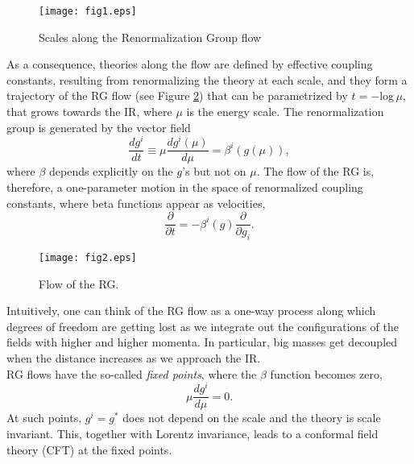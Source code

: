 \documentclass[12pt,a4paper]{article}
\numberwithin{equation}{section}
\begin{document}
\begin{figure}[b]
\begin{center}
\texttt{[image: fig1.eps]}
\caption{\small Scales along the Renormalization Group flow}
\label{figureRGFlow}
\end{center}
\end{figure}


As a consequence, theories along the flow are defined by effective coupling constants, resulting from renormalizing the theory at each scale, and they form a trajectory of the RG flow (see Figure \ref{figureRG_g_Flow}) that can be parametrized by %
$t=-$log$\,\mu$, that grows towards the IR, where $\mu$ is the energy scale. The renormalization group is generated by the vector field
  \begin{equation}
    \frac{d g^i}{dt}\equiv\mu\frac{d g^i(\mu)}{d\mu}=\beta^i(g(\mu)),\nonumber
  \end{equation}
where $\beta$ depends explicitly on the $g$'s but not on $\mu$.
The flow of the RG is, therefore, a one-parameter motion \cite{wilson} in the space of renormalized coupling constants, where beta functions appear as velocities,
%
%
  \begin{equation}
    \frac{\partial}{\partial t} = -\beta^i(g)\frac{\partial}{\partial g_i}.\nonumber
  \end{equation}
\begin{figure}[h]
\begin{center}
\texttt{[image: fig2.eps]}
\caption{\small Flow of the RG.}
\label{figureRG_g_Flow}
\end{center}
\end{figure}
  Intuitively, one can think of the RG flow as a one-way process along which degrees of freedom are getting lost as we integrate out the configurations of the fields with higher and higher momenta. In particular, big masses get decoupled when the distance increases as we approach the IR.\\
RG flows have the so-called \emph{fixed points}, where the $\beta$ function becomes zero,
  \begin{equation}
    \mu\frac{d g^i}{d\mu}=0. \nonumber
  \end{equation}
  At such points, $g^i=g^*$ does not depend on the scale and the theory is scale invariant. This, together with Lorentz invariance, leads to a conformal field theory (CFT) at the fixed points.
\end{document}
